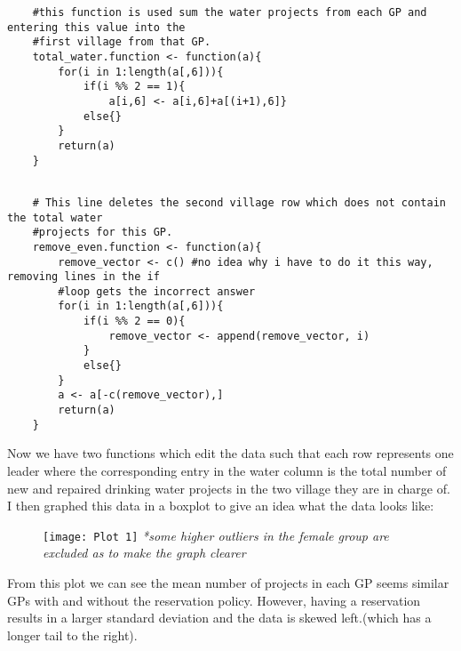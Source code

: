 \documentclass{article}
\begin{document}
\begin{verbatim}
	#this function is used sum the water projects from each GP and entering this value into the 
	#first village from that GP.
	total_water.function <- function(a){
	    for(i in 1:length(a[,6])){
	        if(i %% 2 == 1){
	            a[i,6] <- a[i,6]+a[(i+1),6]}
	        else{}			
	    }
	    return(a)
	}
\end{verbatim}
\pagebreak
\begin{verbatim}
	
	# This line deletes the second village row which does not contain the total water
	#projects for this GP.
	remove_even.function <- function(a){
	    remove_vector <- c() #no idea why i have to do it this way, removing lines in the if
	    #loop gets the incorrect answer
	    for(i in 1:length(a[,6])){
	        if(i %% 2 == 0){
	            remove_vector <- append(remove_vector, i)
	        }
	        else{}
	    }
	    a <- a[-c(remove_vector),]
	    return(a)
	}
\end{verbatim} 
Now we have two functions which edit the data such that each row represents one leader where the corresponding entry in the water column is the total number of new and repaired drinking water projects in the two village they are in charge of. I then graphed this data in a boxplot to give an idea what the data looks like:\\
\begin{figure}[h]
	\centering
	\graphicspath{ {c:/Users/User/Documents/PostGrad/Stats/Assignment 2/plots} }
	\texttt{[image: Plot 1]}
	\textit{*some higher outliers in the female group are excluded as to make the graph clearer}
\end{figure}
\pagebreak
























From this plot we can see the mean number of projects in each GP seems similar GPs with and without the reservation policy. However, having a reservation results in a larger standard deviation and the data is skewed left.(which has a longer tail to the right).\\
\end{document}
